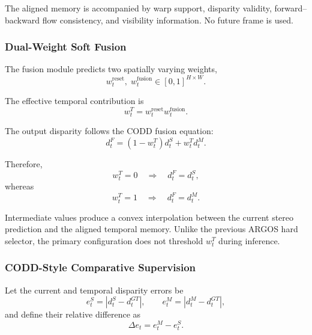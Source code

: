 \documentclass[11pt,a4paper]{article}
\begin{document}
The aligned memory is accompanied by warp support, disparity validity,
forward--backward flow consistency, and visibility information. No future frame is used.

\subsubsection{Dual-Weight Soft Fusion}

The fusion module predicts two spatially varying weights,
\begin{equation}
    w_t^{\mathrm{reset}},\;
    w_t^{\mathrm{fusion}}
    \in [0,1]^{H\times W}.
\end{equation}

The effective temporal contribution is
\begin{equation}
    w_t^{T}
    =
    w_t^{\mathrm{reset}}
    w_t^{\mathrm{fusion}}.
    \label{eq:effective_temporal_weight}
\end{equation}

The output disparity follows the CODD fusion equation:
\begin{equation}
    d_t^{F}
    =
    \left(1-w_t^{T}\right)d_t^{S}
    +
    w_t^{T}d_t^{M}.
    \label{eq:argos_codd_fusion}
\end{equation}

Therefore,
\begin{equation}
    w_t^{T}=0
    \quad\Longrightarrow\quad
    d_t^{F}=d_t^{S},
\end{equation}
whereas
\begin{equation}
    w_t^{T}=1
    \quad\Longrightarrow\quad
    d_t^{F}=d_t^{M}.
\end{equation}

Intermediate values produce a convex interpolation between the current stereo prediction
and the aligned temporal memory. Unlike the previous ARGOS hard selector, the primary
configuration does not threshold \(w_t^{T}\) during inference.

\subsubsection{CODD-Style Comparative Supervision}

Let the current and temporal disparity errors be
\begin{equation}
    e_t^{S}
    =
    \left|d_t^{S}-d_t^{GT}\right|,
    \qquad
    e_t^{M}
    =
    \left|d_t^{M}-d_t^{GT}\right|,
\end{equation}
and define their relative difference as
\begin{equation}
    \Delta e_t
    =
    e_t^{M}-e_t^{S}.
\end{equation}
\end{document}
